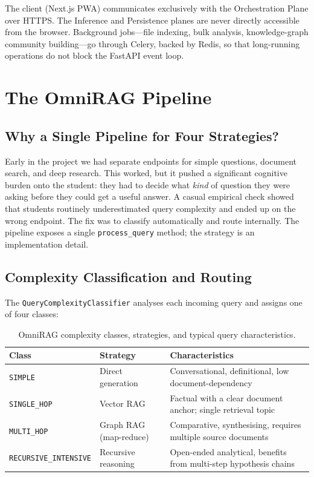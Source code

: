 The client (Next.js PWA) communicates exclusively with the Orchestration Plane
over HTTPS. The Inference and Persistence planes are never directly accessible
from the browser. Background jobs---file indexing, bulk analysis, knowledge-graph
community building---go through Celery, backed by Redis, so that long-running
operations do not block the FastAPI event loop.

\section{The OmniRAG Pipeline}
\label{sec:omnirag}

\subsection{Why a Single Pipeline for Four Strategies?}

Early in the project we had separate endpoints for simple questions, document
search, and deep research. This worked, but it pushed a significant cognitive
burden onto the student: they had to decide what \textit{kind} of question they
were asking before they could get a useful answer. A casual empirical check
showed that students routinely underestimated query complexity and ended up on
the wrong endpoint. The fix was to classify automatically and route internally.
The pipeline exposes a single \texttt{process\_query} method; the strategy is
an implementation detail.

\subsection{Complexity Classification and Routing}

The \texttt{QueryComplexityClassifier} analyses each incoming query and assigns
one of four classes:

\begin{table}[ht]
    \centering
    \caption{OmniRAG complexity classes, strategies, and typical query characteristics.}
    \label{tab:complexity}
    \begin{tabular}{llp{6cm}}
        \toprule
        \textbf{Class} & \textbf{Strategy} & \textbf{Characteristics} \\
        \midrule
        \texttt{SIMPLE} & Direct generation &
            Conversational, definitional, low document-dependency \\
        \texttt{SINGLE\_HOP} & Vector RAG &
            Factual with a clear document anchor; single retrieval topic \\
        \texttt{MULTI\_HOP} & Graph RAG (map-reduce) &
            Comparative, synthesising, requires multiple source documents \\
        \texttt{RECURSIVE\_INTENSIVE} & Recursive reasoning &
            Open-ended analytical, benefits from multi-step hypothesis chains \\
        \bottomrule
    \end{tabular}
\end{table}

